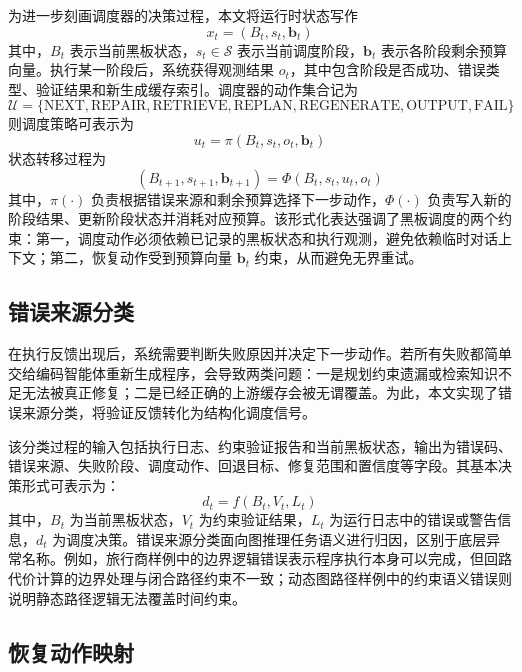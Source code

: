 为进一步刻画调度器的决策过程，本文将运行时状态写作
\begin{equation}
x_t=(B_t,s_t,\mathbf{b}_t)
\end{equation}
其中，$B_t$ 表示当前黑板状态，$s_t\in\mathcal{S}$ 表示当前调度阶段，$\mathbf{b}_t$ 表示各阶段剩余预算向量。执行某一阶段后，系统获得观测结果 $o_t$，其中包含阶段是否成功、错误类型、验证结果和新生成缓存索引。调度器的动作集合记为
\begin{equation}
\mathcal{U}=\{\mathrm{NEXT},\mathrm{REPAIR},\mathrm{RETRIEVE},\mathrm{REPLAN},\mathrm{REGENERATE},\mathrm{OUTPUT},\mathrm{FAIL}\}
\end{equation}
则调度策略可表示为
\begin{equation}
u_t=\pi(B_t,s_t,o_t,\mathbf{b}_t)
\end{equation}
状态转移过程为
\begin{equation}
(B_{t+1},s_{t+1},\mathbf{b}_{t+1})=\Phi(B_t,s_t,u_t,o_t)
\end{equation}
其中，$\pi(\cdot)$ 负责根据错误来源和剩余预算选择下一步动作，$\Phi(\cdot)$ 负责写入新的阶段结果、更新阶段状态并消耗对应预算。该形式化表达强调了黑板调度的两个约束：第一，调度动作必须依赖已记录的黑板状态和执行观测，避免依赖临时对话上下文；第二，恢复动作受到预算向量 $\mathbf{b}_t$ 约束，从而避免无界重试。

\subsection{错误来源分类}

在执行反馈出现后，系统需要判断失败原因并决定下一步动作。若所有失败都简单交给编码智能体重新生成程序，会导致两类问题：一是规划约束遗漏或检索知识不足无法被真正修复；二是已经正确的上游缓存会被无谓覆盖。为此，本文实现了错误来源分类，将验证反馈转化为结构化调度信号。

该分类过程的输入包括执行日志、约束验证报告和当前黑板状态，输出为错误码、错误来源、失败阶段、调度动作、回退目标、修复范围和置信度等字段。其基本决策形式可表示为：
\begin{equation}
d_t=f(B_t,V_t,L_t)
\end{equation}
其中，$B_t$ 为当前黑板状态，$V_t$ 为约束验证结果，$L_t$ 为运行日志中的错误或警告信息，$d_t$ 为调度决策。错误来源分类面向图推理任务语义进行归因，区别于底层异常名称。例如，旅行商样例中的边界逻辑错误表示程序执行本身可以完成，但回路代价计算的边界处理与闭合路径约束不一致；动态图路径样例中的约束语义错误则说明静态路径逻辑无法覆盖时间约束。

\subsection{恢复动作映射}

